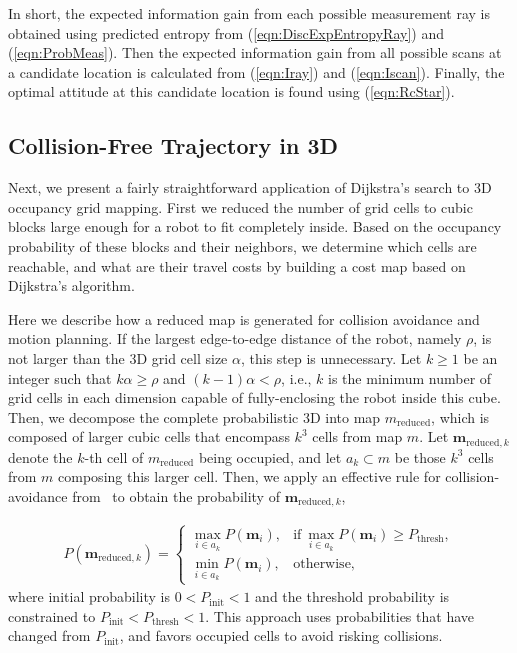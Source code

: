 \documentclass[conf]{new-aiaa}
\newcommand{\refeqn}[1]{(\ref{eqn:#1})}
\begin{document}
In short, the expected information gain from each possible measurement ray is obtained using predicted entropy from \refeqn{DiscExpEntropyRay} and \refeqn{ProbMeas}. Then the expected information gain from all possible scans at a candidate location is calculated from \refeqn{Iray} and \refeqn{Iscan}. Finally, the optimal attitude at this candidate location is found using \refeqn{RcStar}.

\subsection{Collision-Free Trajectory in 3D}

Next, we present a fairly straightforward application of Dijkstra's search to 3D occupancy grid mapping. First we reduced the number of grid cells to cubic blocks large enough for a robot to fit completely inside. Based on the occupancy probability of these blocks and their neighbors, we determine which cells are reachable, and what are their travel costs by building a cost map based on Dijkstra's algorithm.

Here we describe how a reduced map is generated for collision avoidance and motion planning. If the largest edge-to-edge distance of the robot, namely $\rho$, is not larger than the 3D grid cell size $\alpha$, this step is unnecessary. Let $k\geq1$ be an integer such that $k\alpha\geq\rho$ and $(k-1)\alpha<\rho$, i.e., $k$ is the minimum number of grid cells in each dimension capable of fully-enclosing the robot inside this cube. Then, we decompose the complete probabilistic 3D into map $ m_\text{reduced}$, which is composed of larger cubic cells that encompass $k^3$ cells from map $ m$. Let $\mathbf{m}_{\text{reduced},k}$ denote the $k$-th cell of $ m_\text{reduced}$ being occupied, and let $a_k\subset m$ be those $k^3$ cells from $ m$ composing this larger cell. Then, we apply an effective rule for collision-avoidance from~\cite{KauTakAiLee18} to obtain the probability of $\mathbf{m}_{\text{reduced},k}$,

\begin{align}
\label{eqn:Proj3DMapComb}
P(\mathbf{m}_{\text{reduced},k})= 
\begin{cases}
    \max_{i\in a_k}{P(\mathbf{m}_i)},	&\text{if} \ \max_{i\in a_k}{P(\mathbf{m}_i)}\geq P_\text{thresh},\\
    \min_{i\in a_k}{P(\mathbf{m}_i)},	& \text{otherwise},
\end{cases}
\end{align}
where initial probability is $0<P_\text{init}<1$ and the threshold probability is constrained to $P_\text{init}<P_\text{thresh}<1$. This approach uses probabilities that have changed from $P_\text{init}$, and favors occupied cells to avoid risking collisions.
\end{document}
